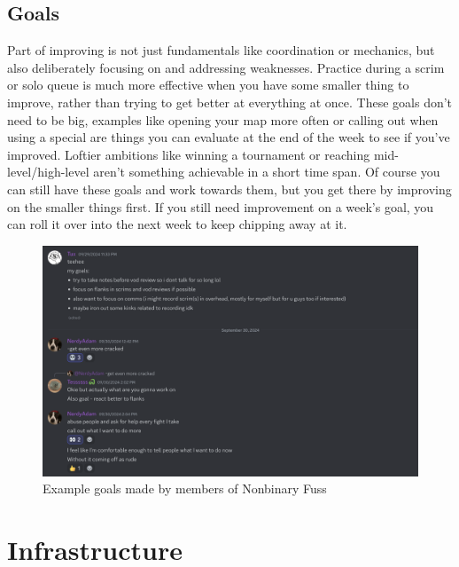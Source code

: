 \documentclass[12pt]{article}
\begin{document}
\subsection{Goals}
Part of improving is not just fundamentals like coordination or mechanics, but also deliberately focusing on and addressing weaknesses. Practice during a scrim or solo queue is much more effective when you have some smaller thing to improve, rather than trying to get better at everything at once. These goals don't need to be big, examples like opening your map more often or calling out when using a special are things you can evaluate at the end of the week to see if you've improved. Loftier ambitions like winning a tournament or reaching mid-level/high-level aren't something achievable in a short time span. Of course you can still have these goals and work towards them, but you get there by improving on the smaller things first. If you still need improvement on a week's goal, you can roll it over into the next week to keep chipping away at it.
\begin{figure}
    \centering
    \includegraphics[width=.95\linewidth]{discord_goals.png}
\caption{Example goals made by members of Nonbinary Fuss}
\end{figure}

\section{Infrastructure}
\end{document}
